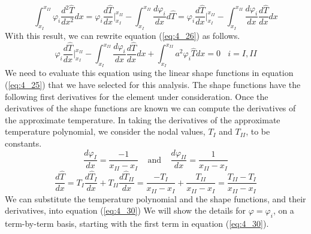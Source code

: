 \documentclass[12pt]{report}
\newcommand{\sps}{\\[0.2cm]}
\newcommand{\refn}[1]{(\ref{#1})}
\newcommand{\refx}[1]{\refn{eq:#1}}
\begin{document}
	\begin{equation}
		\int_{x_{I}}^{x_{II}}\varphi_i\frac{d^2\hat{T}}{dx^2} dx = \varphi_i\frac{d\hat{T}}{dx}\Biggl|_{x_{I}}^{x_{II}} - \int_{x_{I}}^{x_{II}}\frac{d\varphi_i}{dx}d\hat{T} = \varphi_i\frac{d\hat{T}}{dx}\Biggl|_{x_{I}}^{x_{II}} - \int_{x_{I}}^{x_{II}}\frac{d\varphi_i}{dx}\frac{d\hat{T}}{dx}dx \label{eq:4_29}
	\end{equation}
	With this result, we can rewrite equation \refx{4_26} as follows.
	\begin{equation}
		\varphi_i\frac{d\hat{T}}{dx}\Biggl|_{x_{I}}^{x_{II}} -\int_{x_{I}}^{x_{II}}\frac{d\varphi_i}{dx}\frac{d\hat{T}}{dx}dx + \int_{x_{I}}^{x_{II}} a^2 \varphi_i\hat{T} dx = 0 ~~~~ i=I, II \label{eq:4_30}
	\end{equation}
	We need to evaluate this equation using the linear shape functions in equation \refx{4_25} that we have selected for this analysis. The shape functions have the following first derivatives for the element under consideration. Once the derivatives of the shape functions are known we can compute the derivatives of the approximate temperature. In taking the derivatives of the approximate temperature polynomial, we consider the nodal values, $T_I$ and $T_{II}$, to be constants.
	\begin{equation}
		\frac{d\varphi_I}{dx}= \frac{-1}{x_{II}-x_I}~~~~~\text{and}~~~~~ \frac{d\varphi_{II}}{dx} = \frac{1}{x_{II}-x_I}\label{eq:4_31}
	\end{equation}
	\begin{equation*}
		\frac{d\hat{T}}{dx} = T_I\frac{d\hat{T}_I}{dx} + T_{II}\frac{d\hat{T}_{II}}{dx} = \frac{-T_{I}}{x_{II} - x_I}+\frac{T_{II}}{x_{II} - x_I} = \frac{T_{II}- T_I}{x_{II} - x_I}
	\end{equation*}
	We can substitute the temperature polynomial and the shape functions, and their derivatives, into equation \refx{4_30} We will show the details for $\varphi = \varphi_i$, on a term-by-term basis, starting with the first term in equation \refx{4_30}.\sps
	
\end{document}
